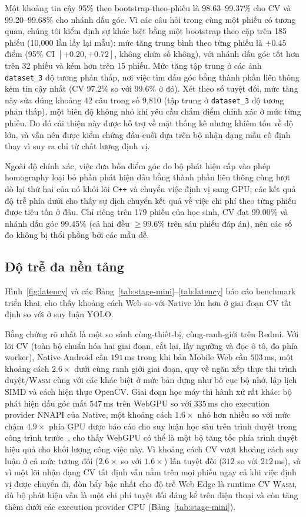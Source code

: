 \documentclass[conference]{IEEEtran}
\newcommand{\wasm}{\textnormal{\textsc{Wasm}}}
\begin{document}
Một khoảng tin cậy 95\% theo bootstrap-theo-phiếu là 98.63--99.37\% cho CV và
99.20--99.68\% cho nhánh dấu góc. Vì các câu hỏi trong cùng một phiếu có tương
quan, chúng tôi kiểm định sự khác biệt bằng một bootstrap theo cặp trên 185 phiếu
(10{,}000 lần lấy lại mẫu): mức tăng trung bình theo từng phiếu là $+0.45$ điểm
(95\% CI $[+0.20,+0.72]$, không chứa số không), với nhánh dấu góc tốt hơn trên 32
phiếu và kém hơn trên 15 phiếu. Mức tăng tập trung ở các ảnh \texttt{dataset\_3}
độ tương phản thấp, nơi việc tìm dấu góc bằng thành phần liên thông kém tin cậy
nhất (CV 97.2\% so với 99.6\% ở đó). Xét theo số tuyệt đối, mức tăng này sửa đúng
khoảng 42 câu trong số 9{,}810 (tập trung ở \texttt{dataset\_3} độ tương phản
thấp), một biên độ không nhỏ khi yêu cầu chấm điểm chính xác ở mức từng phiếu. Do
đó cải thiện này được hỗ trợ về mặt thống kê nhưng khiêm tốn về độ lớn, và vẫn nên
được kiểm chứng đầu-cuối dựa trên bộ nhận dạng mẫu cố định thay vì suy ra chỉ từ
chất lượng định vị.

Ngoài độ chính xác, việc đưa bốn điểm góc do bộ phát hiện cấp vào phép homography
loại bỏ phần phát hiện dấu bằng thành phần liên thông cùng lượt dò lại thứ hai của
nó khỏi lõi C\texttt{++} và chuyển việc định vị sang GPU; các kết quả độ trễ phía
dưới cho thấy sự dịch chuyển kết quả về việc chi phí theo từng phiếu được tiêu tốn
ở đâu. Chỉ riêng trên 179 phiếu của học sinh, CV đạt 99.00\% và nhánh dấu góc
99.45\% (cả hai đều $\geq$99.6\% trên sáu phiếu đáp án), nên các số đo không bị
thổi phồng bởi các mẫu dễ.

\subsection{Độ trễ đa nền tảng}
\label{sec:latency}
Hình~\ref{fig:latency} và các Bảng~\ref{tab:stage-mini}--\ref{tab:latency} báo cáo
benchmark triển khai, cho thấy khoảng cách Web-so-với-Native lớn hơn ở giai đoạn
CV tất định so với ở suy luận YOLO.

Bằng chứng rõ nhất là một so sánh cùng-thiết-bị, cùng-ranh-giới trên Redmi. Với
lõi CV (toàn bộ chuẩn hóa hai giai đoạn, cắt lại, lấy ngưỡng và đọc ô tô, đo phía
worker), Native Android cần $191$\,ms trong khi bản Mobile Web cần $503$\,ms, một
khoảng cách $2.6\times$ dưới cùng ranh giới giai đoạn, quy về ngăn xếp thực thi
trình duyệt/\wasm{} cùng với các khác biệt ở mức bản dựng như bố cục bộ nhớ, lập
lịch SIMD và cách hiện thực OpenCV. Giai đoạn học máy thì hành xử rất khác: bộ
phát hiện dấu góc mất $547$\,ms trên WebGPU so với $335$\,ms cho execution
provider NNAPI của Native, một khoảng cách $1.6\times$ nhỏ hơn nhiều so với mức
chậm $4.9\times$ phía GPU được báo cáo cho suy luận học sâu trên trình duyệt trong
công trình trước~\cite{wang2024}, cho thấy WebGPU có thể là một bộ tăng tốc phía
trình duyệt hiệu quả cho khối lượng công việc này. Vì khoảng cách CV vượt khoảng
cách suy luận ở cả mức tương đối ($2.6\times$ so với $1.6\times$) lẫn tuyệt đối
($312$ so với $212$\,ms), và vì một lõi nhận dạng CV tất định vẫn nằm trên mọi
phiếu ngay cả khi việc định vị được chuyển đi, đòn bẩy bậc nhất cho độ trễ Web
Edge là runtime CV \wasm{}, dù bộ phát hiện vẫn là một chi phí tuyệt đối đáng kể
trên điện thoại và còn tăng thêm dưới các execution provider CPU
(Bảng~\ref{tab:stage-mini}).
\end{document}
